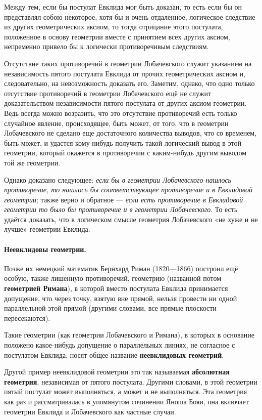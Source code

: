 \documentclass[twoside]{book}
\makeatletter
\newcommand{\rindex}[2][\imki@jobname]{%
  \index[#1]{\detokenize{#2}}%
}
\makeatother
\begin{document}
Между тем, если бы постулат Евклида мог быть доказан, то есть если бы он представлял собою
некоторое, хотя бы и очень отдаленное, логическое следствие из других геометрических аксиом, то тогда отрицание этого постулата, положенное в основу геометрии вместе с принятием всех других аксиом, непременно привело бы к логически противоречивым следствиям.

Отсутствие таких противоречий в геометрии Лобачевского служит указанием на независимость пятого
постулата Евклида от прочих геометрических аксиом и, следовательно, на невозможность доказать его.
Заметим, однако, что одно только отсутствие противоречий в геометрии Лобачевского ещё не служит доказательством независимости пятого постулата от других аксиом геометрии.
Ведь всегда можно возразить, что это отсутствие противоречий есть только
случайное явление, происходящее, быть может, от того, что в геометрии Лобачевского не сделано еще достаточного количества выводов, что со временем, быть может, и удастся кому-нибудь получить
такой логический вывод в этой геометрии, который окажется в противоречии с каким-нибудь другим выводом той же геометрии.

Однако доказано следующее: \emph{если бы в геометрии Лобачевского нашлось противоречие, то нашлось бы соответствующее противоречие и в Евклидовой геометрии};
также верно и обратное --- \emph{если есть противоречие в Евклидовой геометрии то  было бы  противоречие и в геометрии Лобачевского}.
То есть удаётся доказать, что в логическом смысле геометрия Лобачевского «не хуже и не лучше» геометрии Евклида.


\paragraph{Неевклидовы геометрии.}\label{1914/94} 
Позже их немецкий математик Бернхард Риман (1820—1866) построил ещё особую, также лишенную противоречий, геометрию (названной потом \textbf{геометрией Римана}),
в которой вместо постулата Евклида принимается допущение, что
через точку, взятую вне прямой, нельзя провести ни одной параллельной этой прямой (другими словами, все прямые плоскости пересекаются).

Такие геометрии (как геометрии Лобачевского и Римана), в которых в основание положено какое-нибудь допущение о параллельных линиях, не согласное с постулатом Евклида, носят общее название
\textbf{неевклидовых геометрий}.

Другой пример неевклидовой геометрии это так называемая \rindex{абсолютная геометри}\textbf{абсолютная геометрия}, независимая от пятого постулата.
Другими словами, в этой геометрии пятый постулат может выполняться, а может и не выполняться.
Эта геометрия как раз и рассматривалась в упомянутом сочинении Яноша Бояи,
она включает геометрии Евклида и Лобачевского как частные случаи.
\end{document}
